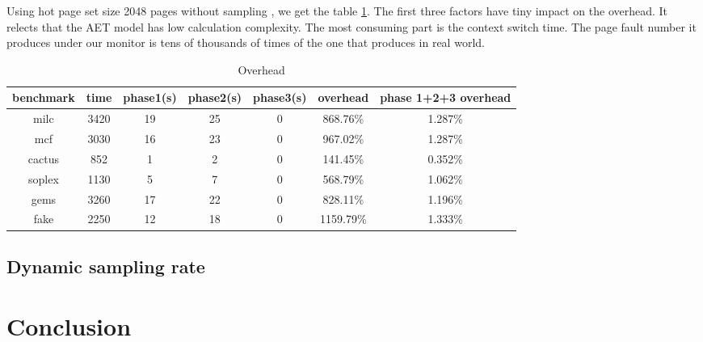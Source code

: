 \documentclass[10pt,twocolumn]{article}
\begin{document}
Using hot page set size 2048 pages without sampling , we get the table \ref{table5}. The first three factors have tiny impact on the overhead. It relects that the AET model has low calculation complexity. The most consuming part is the context switch time. The page fault number it produces under our monitor is tens of thousands of times of the one that produces in real world.

\begin{table}[htbp]
	\caption{Overhead}
	\label{table5}
	\centering
	\begin{tabular}{|c|c|c|c|c|c|c|}
		\hline
		benchmark & time & phase1(s) & phase2(s) & phase3(s) & overhead & phase 1+2+3 overhead \\
		\hline
		milc & 3420 & 19 & 25 & 0 & 868.76\% & 1.287\% \\
		\hline
		mcf  & 3030 & 16 & 23 & 0 & 967.02\% & 1.287\% \\
		\hline
		cactus & 852 & 1 & 2 & 0 & 141.45\% & 0.352\% \\
		\hline
		soplex & 1130 & 5 & 7 & 0 & 568.79\% & 1.062\% \\
		\hline
		gems & 3260 & 17 & 22 & 0 & 828.11\% & 1.196\% \\
		\hline
		fake & 2250 & 12 & 18 & 0 & 1159.79\% & 1.333\% \\
		\hline
		
	\end{tabular}
\end{table}

\subsection{Dynamic sampling rate}

\section{Conclusion}





\end{document}
